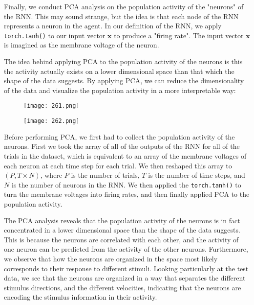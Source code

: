 \documentclass{article}
\begin{document}
Finally, we conduct PCA analysis on the population activity of the "neurons" of the RNN. This may sound strange, but the idea is that each node of the RNN represents a neuron in the agent. In our definition of the RNN, we apply \texttt{torch.tanh()} to our input vector $\boldsymbol{x}$ to produce a "firing rate". The input vector $\boldsymbol{x}$ is imagined as the membrane voltage of the neuron. 
\vspace{1em}

The idea behind applying PCA to the population activity of the neurons is this the activity actually exists on a lower dimensional space than that which the shape of the data suggests. By applying PCA, we can reduce the dimensionality of the data and visualize the population activity in a more interpretable way:

\begin{figure}[ht]
    \centering
    \begin{minipage}{0.48\textwidth}
        \centering
        \texttt{[image: 261.png]} 
    \end{minipage}\hfill
    \begin{minipage}{0.48\textwidth}
        \centering
        \texttt{[image: 262.png]}
    \end{minipage}
\end{figure}
\newpage

Before performing PCA, we first had to collect the population activity of the neurons. First we took the array of all of the outputs of the RNN for all of the trials in the dataset, which is equivalent to an array of the membrane voltages of each neuron at each time step for each trial. We then reshaped this array to $(P, T \times N)$, where $P$ is the number of trials, $T$ is the number of time steps, and $N$ is the number of neurons in the RNN. We then applied the \texttt{torch.tanh()} to turn the membrane voltages into firing rates, and then finally applied PCA to the population activity.
\vspace{1em}

The PCA analysis reveals that the population activity of the neurons is in fact concentrated in a lower dimensional space than the shape of the data suggests. This is because the neurons are correlated with each other, and the activity of one neuron can be predicted from the activity of the other neurons. Furthermore, we observe that how the neurons are organized in the space most likely corresponds to their response to different stimuli. Looking particularly at the test data, we see that the neurons are organized in a way that separates the different stimulus directions, and the different velocities, indicating that the neurons are encoding the stimulus information in their activity.
\vspace{1em}
\end{document}
